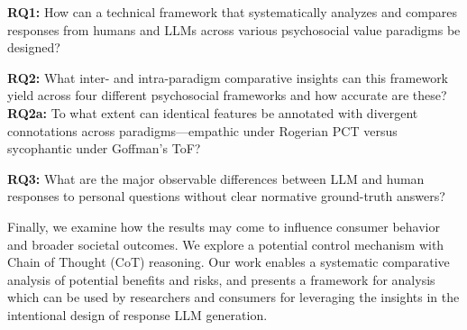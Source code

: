\medskip\textbf{RQ1:} How can a technical framework that systematically analyzes and compares responses from humans and LLMs across various psychosocial value paradigms be designed?  

\medskip\textbf{RQ2:} What inter- and intra-paradigm comparative insights can this framework yield across four different psychosocial frameworks and how accurate are these?
\textbf{RQ2a:} To what extent can identical features be annotated with divergent connotations across paradigms—empathic under Rogerian PCT versus sycophantic under Goffman’s ToF?

\medskip\textbf{RQ3:} What are the major observable differences between LLM and human responses to personal questions without clear normative ground-truth answers? 

Finally, we examine how the results may come to influence consumer behavior and broader societal outcomes. We explore a potential control mechanism with Chain of Thought (CoT) reasoning. Our work enables a systematic comparative analysis of potential benefits and risks, and presents a framework for analysis which can be used by researchers and consumers for leveraging the insights in the intentional design of response LLM generation.






